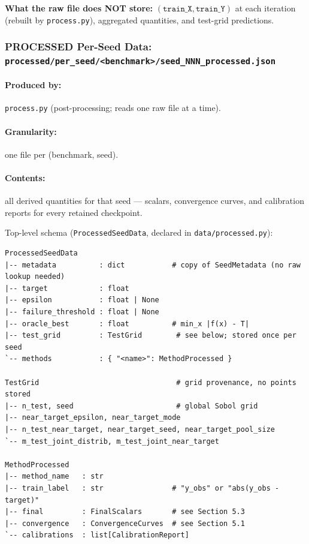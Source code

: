 \documentclass[11pt]{article}
\begin{document}
\textbf{What the raw file does NOT store:}
$(\texttt{train\_X}, \texttt{train\_Y})$ at each iteration (rebuilt by
\texttt{process.py}), aggregated quantities, and test-grid predictions.
 
\subsubsection{PROCESSED Per-Seed Data:
  \texttt{processed/per\_seed/<benchmark>/seed\_NNN\_processed.json}}
\label{sec:processed}
 
\paragraph{Produced by:} \texttt{process.py} (post-processing; reads one raw file at a time).
\paragraph{Granularity:} one file per (benchmark, seed).
\paragraph{Contents:} all derived quantities for that seed --- scalars, convergence
curves, and calibration reports for every retained checkpoint.
 
\medskip
Top-level schema (\texttt{ProcessedSeedData}, declared in \texttt{data/processed.py}):
\begin{lstlisting}
ProcessedSeedData
|-- metadata          : dict           # copy of SeedMetadata (no raw lookup needed)
|-- target            : float
|-- epsilon           : float | None
|-- failure_threshold : float | None
|-- oracle_best       : float          # min_x |f(x) - T|
|-- test_grid         : TestGrid        # see below; stored once per seed
`-- methods           : { "<name>": MethodProcessed }

TestGrid                                # grid provenance, no points stored
|-- n_test, seed                        # global Sobol grid
|-- near_target_epsilon, near_target_mode
|-- n_test_near_target, near_target_seed, near_target_pool_size
`-- m_test_joint_distrib, m_test_joint_near_target

MethodProcessed
|-- method_name   : str
|-- train_label   : str                # "y_obs" or "abs(y_obs - target)"
|-- final         : FinalScalars       # see Section 5.3
|-- convergence   : ConvergenceCurves  # see Section 5.1
`-- calibrations  : list[CalibrationReport]
\end{lstlisting}
\end{document}
